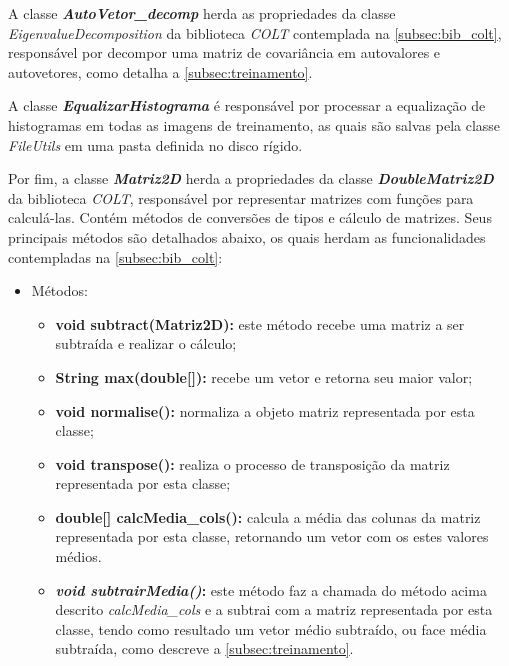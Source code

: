 A classe \textit{\textbf{AutoVetor\_decomp}} herda as propriedades da classe \textit{EigenvalueDecomposition} da biblioteca \textit{COLT} contemplada na \autoref{subsec:bib_colt}, responsável por decompor uma matriz de covariância em autovalores e autovetores, como detalha a \autoref{subsec:treinamento}.


A classe \textit{\textbf{EqualizarHistograma}} é responsável por processar a equalização de histogramas em todas as imagens de treinamento, as quais são salvas pela classe \textit{FileUtils} em uma pasta definida no disco rígido.


Por fim, a classe \textit{\textbf{Matriz2D}} herda a propriedades da classe \textit{\textbf{DoubleMatriz2D }} da biblioteca \textit{COLT}, responsável por representar matrizes com funções para calculá-las. Contém métodos de conversões de tipos e cálculo de matrizes. Seus principais métodos são detalhados abaixo, os quais herdam as funcionalidades contempladas na \autoref{subsec:bib_colt}:
\begin{itemize}	
	\item Métodos:
	\begin{itemize}
		\item \textbf{void subtract(Matriz2D):} este método recebe uma matriz a ser subtraída e realizar o cálculo;
		
		\item \textbf{String max(double[]):} recebe um vetor e retorna seu maior valor;
		
		\item \textbf{void normalise():} normaliza a objeto matriz representada por esta classe;
		
		\item \textbf{void transpose():} realiza o processo de transposição da matriz representada por esta classe;
		
		\item \textbf{double[] calcMedia\_cols():} calcula a média das colunas da matriz representada por esta classe, retornando um vetor com os estes valores médios.
		
		\item \textbf{\textit{void subtrairMedia()}:} este método faz a chamada do método acima descrito 		 \textit{calcMedia\_cols} e a subtrai com a matriz representada por esta classe, tendo como resultado um vetor médio subtraído, ou face média subtraída, como descreve a \autoref{subsec:treinamento}.

	\end{itemize}
\end{itemize}




